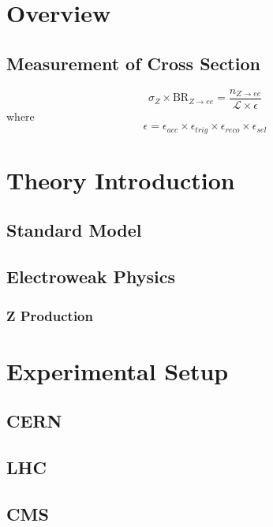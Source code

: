 \documentclass [11pt, twoside] {uwthesis}
\begin{document}
%

%

%

%



\chapter{Overview}
\section{Measurement of Cross Section}
\[
\sigma_{Z} \times \textrm{BR}_{Z \rightarrow ee} = \frac{ n_{Z \rightarrow ee} }{  \mathcal{L} \times \epsilon }
\]
where 
\[
\epsilon = \epsilon_{acc} \times \epsilon_{trig} \times \epsilon_{reco} \times \epsilon_{sel}
\]
\chapter{Theory Introduction}
\section{Standard Model}
\section{Electroweak Physics}
\subsection{Z Production}
\chapter{Experimental Setup}
\section{CERN}
\section{LHC}
\section{CMS}
\end{document}
